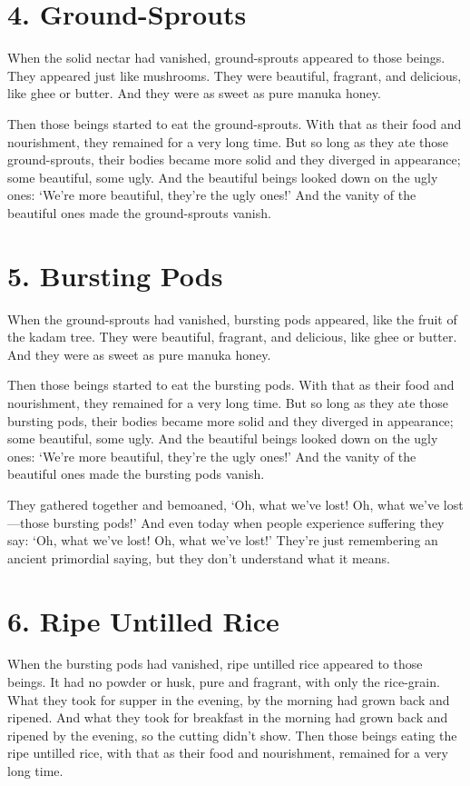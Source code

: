\documentclass[12pt,openany]{book}%
\begin{document}
\section*{4. Ground-Sprouts }

When the solid nectar had vanished, ground-sprouts appeared to those beings. They appeared just like mushrooms. They were beautiful, fragrant, and delicious, like ghee or butter. And they were as sweet as pure manuka honey. 

Then those beings started to eat the ground-sprouts. With that as their food and nourishment, they remained for a very long time. But so long as they ate those ground-sprouts, their bodies became more solid and they diverged in appearance; some beautiful, some ugly. And the beautiful beings looked down on the ugly ones: ‘We’re more beautiful, they’re the ugly ones!’ And the vanity of the beautiful ones made the ground-sprouts vanish. 

\section*{5. Bursting Pods }

When the ground-sprouts had vanished, bursting pods appeared, like the fruit of the kadam tree. They were beautiful, fragrant, and delicious, like ghee or butter. And they were as sweet as pure manuka honey. 

Then those beings started to eat the bursting pods. With that as their food and nourishment, they remained for a very long time. But so long as they ate those bursting pods, their bodies became more solid and they diverged in appearance; some beautiful, some ugly. And the beautiful beings looked down on the ugly ones: ‘We’re more beautiful, they’re the ugly ones!’ And the vanity of the beautiful ones made the bursting pods vanish. 

They gathered together and bemoaned, ‘Oh, what we’ve lost! Oh, what we’ve lost—those bursting pods!’ And even today when people experience suffering they say: ‘Oh, what we’ve lost! Oh, what we’ve lost!’ They’re just remembering an ancient primordial saying, but they don’t understand what it means. 

\section*{6. Ripe Untilled Rice }

When the bursting pods had vanished, ripe untilled rice appeared to those beings. It had no powder or husk, pure and fragrant, with only the rice-grain. What they took for supper in the evening, by the morning had grown back and ripened. And what they took for breakfast in the morning had grown back and ripened by the evening, so the cutting didn’t show. Then those beings eating the ripe untilled rice, with that as their food and nourishment, remained for a very long time. 
\end{document}
